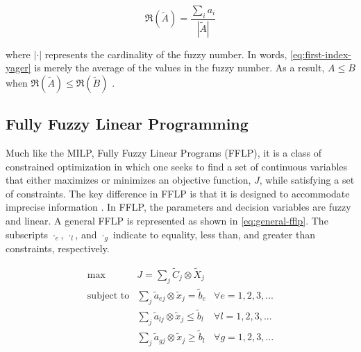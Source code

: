 \documentclass[11pt,a4paper,final]{article}
\begin{document}
\begin{equation}
\label{eq:first-index-yager}
\mathfrak{R}(\tilde{A}) = \frac{\sum_i a_i}{|\tilde{A}|}
\end{equation}

\noindent where \(|\cdot|\) represents the cardinality of the fuzzy number. In words, \ref{eq:first-index-yager} is merely the
average of the values in the fuzzy number. As a result, \(A \le B\) when \(\mathfrak{R}(\tilde{A}) \le \mathfrak{R}(\tilde{B})\)
\cite{bello-2019-fuzzy-activ}.

\subsection{Fully Fuzzy Linear Programming}
\label{sec:fully-fuzzy-linear-programming}
Much like the MILP, Fully Fuzzy Linear Programs (FFLP), it is a class of constrained optimization in which one seeks to
find a set of continuous variables that either maximizes or minimizes an objective function, \(J\), while satisfying a set
of constraints. The key difference in FFLP is that it is designed to accommodate imprecise information
\cite{bello-2019-fuzzy-activ,kaur-2016-introd-fuzzy}. In FFLP, the parameters and decision variables are fuzzy and
linear. A general FFLP is represented as shown in \ref{eq:general-fflp}. The subscripts \(\cdot_e\), \(\cdot_l\), and \(\cdot_g\) indicate to
equality, less than, and greater than constraints, respectively.

\begin{equation}
\label{eq:general-fflp}
\begin{array}{lll}
\text{max}   & J = \sum_j \tilde{C}_j \otimes \tilde{X}_j              &                 \\
\text{subject to} & \sum_j \tilde{a}_{ej} \otimes \tilde{x}_j = \tilde{b}_e &  \forall e = 1,2,3,... \\
                  & \sum_j \tilde{a}_{lj} \otimes \tilde{x}_j \le \tilde{b}_l &  \forall l = 1,2,3,... \\
                  & \sum_j \tilde{a}_{gj} \otimes \tilde{x}_j \ge \tilde{b}_l &  \forall g = 1,2,3,...
\end{array}
\end{equation}
\end{document}
